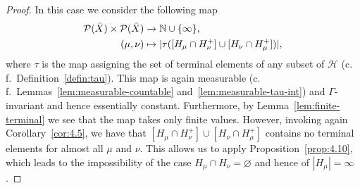 \begin{proof}
  In this case we consider the following map
  \begin{align*}
    \mathcal{P}(\bar X) \times \mathcal{P}(\bar X) &\to \mathbb{N} \cup \{\infty\},\\
    (\mu, \nu) &\mapsto |\tau([H_\mu \cap H_\nu^+] \cup [H_\nu \cap H_\mu^+])|,
  \end{align*}
  where \(\tau\) is the map assigning the set of terminal elements of any subset of \(\mathcal{H}\) (c.\,f.~Definition~\ref{defin:tau}). This map is again measurable (c.\,f.\ Lemmas~\ref{lem:measurable-countable} and~\ref{lem:measurable-tau-int}) and \(\Gamma\)-invariant and hence essentially constant. Furthermore, by Lemma~\ref{lem:finite-terminal} we see that the map takes only finite values. However, invoking again Corollary~\ref{cor:4.5}, we have that \([H_\mu \cap H_\nu^+] \cup [H_\nu \cap H_\mu^+]\) contains no terminal elements for almost all \(\mu\) and \(\nu\). This allows us to apply Proposition~\ref{prop:4.10}, which leads to the impossibility of the case \(H_\mu \cap H_\nu = \varnothing\) and hence of \(|H_\mu| = \infty\). 



\end{proof}
